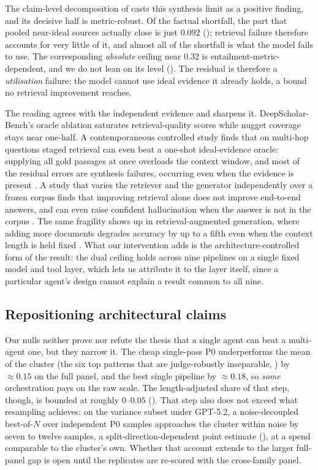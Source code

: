 \documentclass[11pt]{article}
\begin{document}
The claim-level decomposition of  casts this synthesis limit as a
positive finding, and its decisive half is metric-robust. Of
the factual shortfall, the part that pooled near-ideal sources actually close is just
$0.092$ (); retrieval failure therefore accounts for very little of it,
and almost all of the shortfall is what the model fails to use. The corresponding
\emph{absolute} ceiling near $0.32$ is entailment-metric-dependent, and we do not lean on
its level (). The
residual is therefore a \emph{utilisation} failure: the model cannot use ideal evidence it
already holds, a bound no retrieval improvement reaches.

The reading agrees with the independent evidence and sharpens it. DeepScholar-Bench's
oracle ablation \citep{deepscholarbench2025} saturates retrieval-quality scores while
nugget coverage stays near one-half. A contemporaneous controlled study finds that on
multi-hop questions staged retrieval can even beat a one-shot ideal-evidence oracle:
supplying all gold passages at once overloads the context window, and most of the
residual errors are synthesis failures, occurring even when the evidence is present
\citep{iterativeideal2026}. A study that varies the retriever and the generator
independently over a frozen corpus finds that improving retrieval alone does not improve
end-to-end answers, and can even raise confident hallucination when the answer is not in
the corpus \citep{mathur2026noguarantee}. The same fragility shows up in
retrieval-augmented generation, where adding more documents degrades accuracy by up to a
fifth even when the context length is held fixed \citep{levy2025moredocs}. What our
intervention adds is the architecture-controlled form of the result: the dual ceiling
holds across nine pipelines on a single fixed model and tool layer, which lets us
attribute it to the layer itself, since a particular agent's design cannot explain a
result common to all nine.

\subsection{Repositioning architectural claims}
Our nulls neither prove nor refute the thesis that a single agent can beat a multi-agent
one, but they narrow it. The cheap single-pass P0 underperforms the mean of the cluster (the six
top patterns that are judge-robustly inseparable, ) by $\approx0.15$ on
the full panel, and the best single pipeline by $\approx0.18$, so \emph{some}
orchestration pays on the raw scale. The length-adjusted share of that step, though, is
bounded at roughly $0$--$0.05$ (). That step also does not exceed
what resampling achieves: on the variance subset under GPT-5.2, a noise-decoupled
best-of-$N$ over independent P0 samples approaches the cluster within noise by seven to
twelve samples, a split-direction-dependent point estimate (), at a
spend comparable to the cluster's own. Whether that account extends to the larger
full-panel gap is open until the replicates are re-scored with the cross-family panel.
\end{document}

